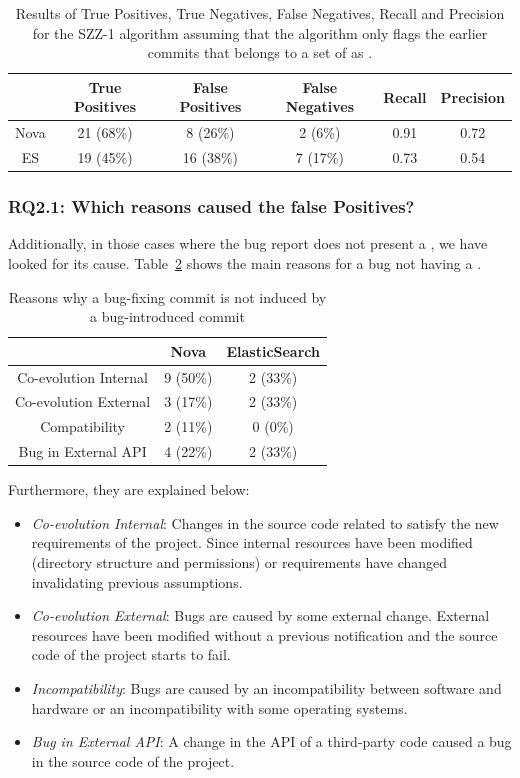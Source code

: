 \documentclass[a4paper, 12pt]{book}
\begin{document}
\begin{table}[!t]
	\renewcommand{\arraystretch}{1.3}
	\caption{Results of True Positives, True Negatives, False Negatives, Recall and Precision for the SZZ-1 algorithm assuming that the algorithm only flags the earlier commits that belongs to a set of  as \BIC.}
	\label{realSZZ2}
	\centering
	\begin{tabular}{|c|c|c|c|c|c|}
		\hline
 	 	&  True Positives & False Positives & False Negatives & Recall & Precision \\
		\hline
		\hline
		Nova & 21 (68\%) & 8 (26\%) & 2 (6\%) & 0.91 & 0.72\\
		\hline
		ES &  19 (45\%) & 16 (38\%) & 7 (17\%)& 0.73 & 0.54 \\
		\hline
	\end{tabular}
\end{table}

\subsubsection{RQ2.1: Which reasons caused the false Positives?}
Additionally, in those cases where the bug report does not present a \BIC, we have looked for its cause. Table~\ref{tablereasosNoBIC} shows the main reasons for a bug not having a \BIC. 
\begin{table}[!t]
	\renewcommand{\arraystretch}{1.3}
	\caption{ Reasons why a bug-fixing commit is not induced by a bug-introduced commit }
	\label{tablereasosNoBIC}
	\centering
	\begin{tabular}{|c|c|c|}
		\hline
  		& Nova & ElasticSearch  \\
		\hline
		\hline
		Co-evolution Internal & 9 (50\%) & 2 (33\%) \\
		\hline
		Co-evolution External  & 3 (17\%) & 2 (33\%)\\
		\hline
		Compatibility & 2 (11\%) & 0 (0\%)\\
		\hline
		Bug in External API & 4 (22\%) & 2 (33\%)\\
		\hline
	\end{tabular}
\end{table}
Furthermore, they are explained below:
\begin{itemize}
 	\item \textit{Co-evolution Internal}: Changes in the source code related to satisfy the new requirements of the project. Since internal resources have been modified (directory structure and permissions) or requirements have changed invalidating previous assumptions.  	
	\item \textit{Co-evolution External}: Bugs are caused by some external change. External resources have been modified without a previous notification and the source code of the project starts to fail.
  	\item \textit{Incompatibility}: Bugs are caused by an incompatibility between software and hardware or an incompatibility with some operating systems.
  	\item \textit{Bug in External API}: A change in the API of a third-party code caused a bug in the source code of the project.
\end{itemize}
\end{document}
